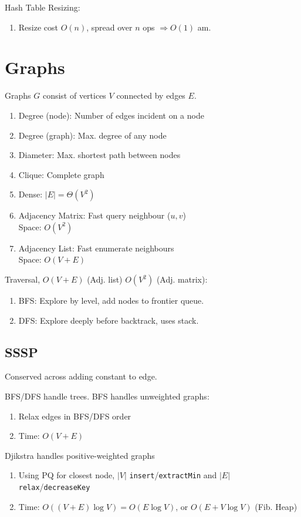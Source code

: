 \documentclass[12pt, a4paper]{article}
\begin{document}
\begin{multicols*}{3}
Hash Table Resizing:
\begin{enumerate}[\roman*.]
  \item Resize cost $O(n)$, spread over $n$ ops $\Rightarrow O(1)$ am.
\end{enumerate}

\colbreak
\section{Graphs}
Graphs $G$ consist of vertices $V$ connected by edges $E$.
\begin{enumerate}[\roman*.]
  \item Degree (node): Number of edges incident on a node
  \item Degree (graph): Max. degree of any node
  \item Diameter: Max. shortest path between nodes 
  \item Clique: Complete graph
  \item Dense: $|E| = \Theta(V^2)$
  \item Adjacency Matrix: Fast query neighbour ($u,v$)\\Space: $O(V^2)$
  \item Adjacency List: Fast enumerate neighbours\\Space: $O(V+E)$
\end{enumerate}

Traversal, $O(V+E)$ (Adj. list) $O(V^2)$ (Adj. matrix):
\begin{enumerate}[\roman*.]
  \item BFS: Explore by level, add nodes to frontier queue.
  \item DFS: Explore deeply before backtrack, uses stack.
\end{enumerate}

\subsection{SSSP}

Conserved across adding constant to edge.

BFS/DFS handle trees. BFS handles unweighted graphs:
\begin{enumerate}[\roman*.]
  \item Relax edges in BFS/DFS order
  \item Time: $O(V+E)$
\end{enumerate}

Djikstra handles positive-weighted graphs 
\begin{enumerate}[\roman*.]
  \item Using PQ for closest node, $|V|$ \lstinline|insert|/\lstinline|extractMin| and $|E|$ \lstinline|relax|/\lstinline|decreaseKey| 
  \item Time: $O((V+E)\log V) = O(E\log V)$, or $O(E+V\log V)$ (Fib. Heap)
\end{enumerate}


\end{multicols*}
\end{document}
